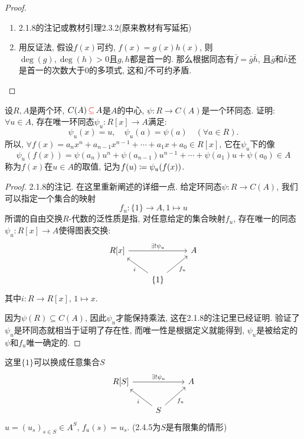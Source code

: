 \documentclass{../solutions-cn}
\begin{document}
\begin{proof}
    \begin{enumerate}[(1)]
        \item 2.1.8的注记或教材引理2.3.2(原来教材有写延拓)
        \item 用反证法, 假设$f(x)$可约, $f(x) = g(x)h(x)$, 则$\deg(g), \deg(h) > 0$且$g, h$都是首一的. 那么根据同态有$\bar{f} = \bar{g}\bar{h}$, 且$\bar{g}$和$\bar{h}$还是首一的次数大于$0$的多项式, 这和$\bar{f}$不可约矛盾.
    \end{enumerate}
\end{proof}

\begin{exercise}[习题2.3.7]
    设$R, A$是两个环, $C(A) \,\textcolor{red}{\subseteq}\, A$是$A$的中心, $\psi:R \to C(A)$是一个环同态. 证明: $\forall u \in A$, 存在唯一环同态$\psi_u:R[x] \to A$满足: 
    \[
        \psi_u(x) = u,\quad \psi_u(a) = \psi(a) \quad (\forall a \in R).
    \]
    所以, $\forall f(x) = a_nx^n + a_{n - 1}x^{n - 1} + \cdots + a_1x + a_0 \in R[x]$, 它在$\psi_u$下的像
    \[
        \psi_u(f(x)) = \psi(a_n)u^n + \psi(a_{n - 1})u^{n - 1} + \cdots + \psi(a_1)u + \psi(a_0) \in A
    \]
    称为$f(x)$在$u \in A$的取值, 记为$f(u) \mathrel{\coloneqq} \psi_u(f(x))$.
\end{exercise}

\begin{proof}
    2.1.8的注记. 在这里重新阐述的详细一点. 给定环同态$\psi:R \to C(A)$, 我们可以指定一个集合的映射
    \[
        f_u:\{1\} \to A, 1 \mapsto u
    \]
    所谓的自由交换$R$-代数的泛性质是指, 对任意给定的集合映射$f_u$, 存在唯一的同态$\psi_u:R[x] \to A$使得图表交换:
    \[
        \begin{tikzcd}
            {R[x]} \arrow[rr, "\exists!\psi_u"] &                                          & A \\
                                                & \{1\} \arrow[lu, "i"] \arrow[ru, "f_u"'] &  
        \end{tikzcd}
    \]
    其中$i:R \to R[x],\, 1 \mapsto x$.

    因为$\psi(R) \subseteq C(A)$, 因此$\psi_u$才能保持乘法, 这在2.1.8的注记里已经证明. 验证了$\psi_u$是环同态就相当于证明了存在性, 而唯一性是根据定义就能得到, $\psi_u$是被给定的$\psi$和$f_u$唯一确定的.
\end{proof}

\begin{remark}
    这里$\{1\}$可以换成任意集合$S$
    \[
        \begin{tikzcd}
        {R[S]} \arrow[rr, "\exists!\psi_u"] &                                      & A \\
                                            & S \arrow[lu, "i"] \arrow[ru, "f_u"'] &  
        \end{tikzcd}
    \]
    $u = (u_s)_{s \in S} \in A^S,\, f_u(s) = u_s$. (2.4.5为$S$是有限集的情形)
\end{remark}
\end{document}
